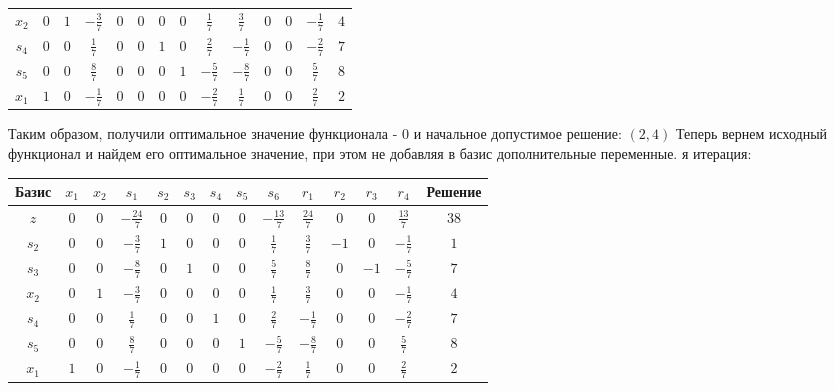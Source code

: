 \documentclass{article}%
\begin{document}
\begin{flushleft}
\begin{tabular}{|c|cccccccccccc|c|}
$x_{2}$&$0$&$1$&$-\frac{3}{7}$&$0$&$0$&$0$&$0$&$\frac{1}{7}$&$\frac{3}{7}$&$0$&$0$&$-\frac{1}{7}$&$4$\\%
$s_{4}$&$0$&$0$&$\frac{1}{7}$&$0$&$0$&$1$&$0$&$\frac{2}{7}$&$-\frac{1}{7}$&$0$&$0$&$-\frac{2}{7}$&$7$\\%
$s_{5}$&$0$&$0$&$\frac{8}{7}$&$0$&$0$&$0$&$1$&$-\frac{5}{7}$&$-\frac{8}{7}$&$0$&$0$&$\frac{5}{7}$&$8$\\%
$x_{1}$&$1$&$0$&$-\frac{1}{7}$&$0$&$0$&$0$&$0$&$-\frac{2}{7}$&$\frac{1}{7}$&$0$&$0$&$\frac{2}{7}$&$2$\\%
\hline%
\end{tabular}%
\newline%
\newline%
Таким образом, получили оптимальное значение функционала {-} 0 и начальное допустимое решение: %
$(2, 4)$%
\newline%
Теперь вернем исходный функционал и найдем его оптимальное значение, при этом не добавляя в базис дополнительные переменные.%
я итерация: %
\newline%
\newline%
\renewcommand{\arraystretch}{1.3}%
\begin{tabular}{|c|cccccccccccc|c|}%
\hline%
Базис&$x_{1}$&$x_{2}$&$s_{1}$&$s_{2}$&$s_{3}$&$s_{4}$&$s_{5}$&$s_{6}$&$r_{1}$&$r_{2}$&$r_{3}$&$r_{4}$&Решение\\%
\hline%
$z$&$0$&$0$&$-\frac{24}{7}$&$0$&$0$&$0$&$0$&$-\frac{13}{7}$&$\frac{24}{7}$&$0$&$0$&$\frac{13}{7}$&$38$\\%
\hline%
$s_{2}$&$0$&$0$&$-\frac{3}{7}$&$1$&$0$&$0$&$0$&$\frac{1}{7}$&$\frac{3}{7}$&$-1$&$0$&$-\frac{1}{7}$&$1$\\%
$s_{3}$&$0$&$0$&$-\frac{8}{7}$&$0$&$1$&$0$&$0$&$\frac{5}{7}$&$\frac{8}{7}$&$0$&$-1$&$-\frac{5}{7}$&$7$\\%
$x_{2}$&$0$&$1$&$-\frac{3}{7}$&$0$&$0$&$0$&$0$&$\frac{1}{7}$&$\frac{3}{7}$&$0$&$0$&$-\frac{1}{7}$&$4$\\%
$s_{4}$&$0$&$0$&$\frac{1}{7}$&$0$&$0$&$1$&$0$&$\frac{2}{7}$&$-\frac{1}{7}$&$0$&$0$&$-\frac{2}{7}$&$7$\\%
$s_{5}$&$0$&$0$&$\frac{8}{7}$&$0$&$0$&$0$&$1$&$-\frac{5}{7}$&$-\frac{8}{7}$&$0$&$0$&$\frac{5}{7}$&$8$\\%
$x_{1}$&$1$&$0$&$-\frac{1}{7}$&$0$&$0$&$0$&$0$&$-\frac{2}{7}$&$\frac{1}{7}$&$0$&$0$&$\frac{2}{7}$&$2$\\%
\hline%
\end{tabular}%
\newline%

\end{flushleft}
\end{document}
